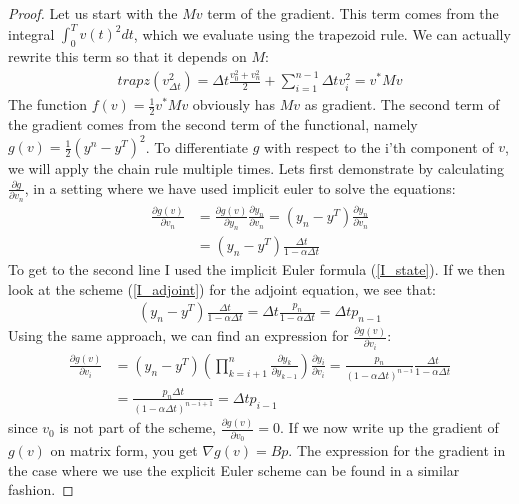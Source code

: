 \begin{proof}
Let us start with the $Mv$ term of the gradient. This term comes from the integral $\int_0^T v(t)^2dt$, which we evaluate using the trapezoid rule. We can actually rewrite this term so that it depends on $M$:
\begin{align*}
trapz(v_{\Delta t}^2)=  \Delta t\frac{v_0^2+v_n^2}{2} + \sum_{i=1}^{n-1} \Delta t v_i^2 = v^*Mv
\end{align*} 
The function $f(v)=\frac{1}{2} v^*Mv$ obviously has $Mv$ as gradient. The second term of the gradient comes from the second term of the functional, namely $g(v)=\frac{1}{2}(y^n -y^T)^2$. To differentiate $g$ with respect to the i'th component of $v$, we will apply the chain rule multiple times. Lets first demonstrate by calculating $\frac{\partial g}{\partial v_n}$, in a setting where we have used implicit euler to solve the equations:
\begin{align*}
\frac{\partial g(v)}{\partial v_n} &= \frac{\partial g(v)}{\partial y_n}\frac{\partial y_n}{\partial v_n} = (y_n -y^T)\frac{\partial y_n}{\partial v_n}\\
&= (y_n -y^T)\frac{\Delta t}{1-\alpha\Delta t}
\end{align*}
To get to the second line I used the implicit Euler formula (\ref{I_state}). If we then look at the scheme (\ref{I_adjoint}) for the adjoint equation, we see that:
\begin{align*}
(y_n -y^T)\frac{\Delta t}{1-\alpha\Delta t} = \Delta t\frac{p_n}{1-\alpha\Delta t} = \Delta t p_{n-1}
\end{align*} 
Using the same approach, we can find an expression for $\frac{\partial g(v)}{\partial v_i}$: 
\begin{align*}
\frac{\partial g(v)}{\partial v_i} &= (y_n -y^T) (\prod_{k=i+1}^{n}\frac{\partial y_{k}}{\partial y_{k-1}}) \frac{\partial y_i}{\partial v_{i}} = \frac{p_n}{(1-\alpha\Delta t)^{n-i}}\frac{\Delta t}{1-\alpha\Delta t} \\
&= \frac{p_n\Delta t}{(1-\alpha\Delta t)^{n-i+1}}=\Delta t p_{i-1}
\end{align*}
since $v_0$ is not part of the scheme, $\frac{\partial g(v)}{\partial v_0}=0$. If we now write up the gradient of $g(v)$ on matrix form, you get $\nabla g(v) = Bp$. The expression for the gradient in the case where we use the explicit Euler scheme can be found in a similar fashion. 
\end{proof}
